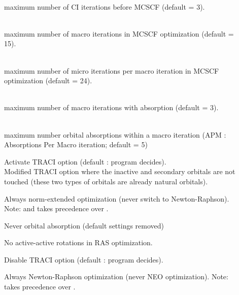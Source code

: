 \begin{description}
\item[]
   \\
  maximum number of CI iterations before MCSCF (default = 3).

\item[]
   \\
  maximum number of macro iterations in MCSCF optimization (default = 15).

\item[]
   \\
  maximum number of micro iterations per macro iteration in MCSCF optimization
  (default = 24).

\item[]
   \\
  maximum number of macro iterations with 
  absorption (default = 3).

\item[]
   \\
  maximum number orbital absorptions within
  a macro iteration
  (APM : Absorptions Per Macro iteration; default = 5)

\item[]
  Activate TRACI option (default : program decides).\\
  Modified TRACI option where the inactive and secondary orbitals are not
  touched (these two types of orbitals are already natural orbitals).

\item[]
  Always norm-extended optimization (never switch to New\-ton-Raph\-son).
  Note:  and 
  takes precedence over .

\item[]
  Never orbital absorption (default settings removed)

\item[]
  No active-active rotations in RAS optimization.

\item[]
  Disable TRACI option (default : program decides).

\item[]
  Always Newton-Raphson optimization (never NEO optimization).
  Note:  takes precedence over
  .


\end{description}

